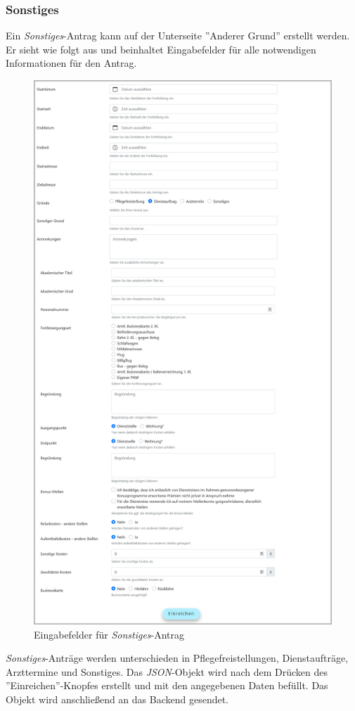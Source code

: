 \subsubsection{Sonstiges}
Ein \textit{Sonstiges}-Antrag kann auf der Unterseite ''Anderer Grund'' erstellt werden. Er sieht wie folgt aus und beinhaltet Eingabefelder für alle notwendigen Informationen für den Antrag.
\begin{figure}[H]
	\centering
	\includegraphics[width=0.6\linewidth]{images/rfoster_implementierung/othercause}
	\caption[Sonstiges Antrag]{Eingabefelder für \textit{Sonstiges}-Antrag}
	\label{fig:othercause}
\end{figure}
\textit{Sonstiges}-Anträge werden unterschieden in Pflegefreistellungen, Dienstaufträge, Arzttermine und Sonstiges. Das \textit{JSON}-Objekt wird nach dem Drücken des ''Einreichen''-Knopfes erstellt und mit den angegebenen Daten befüllt. Das Objekt wird anschließend an das Backend gesendet.\\

